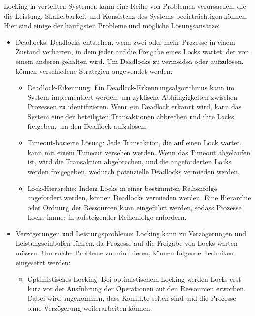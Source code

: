 \documentclass[../vs-script-first-v01.tex]{subfiles}
\begin{document}
Locking in verteilten Systemen kann eine Reihe von Problemen verursachen, die die Leistung, Skalierbarkeit und Konsistenz des Systems beeinträchtigen können. Hier sind einige der häufigsten Probleme und mögliche Lösungsansätze:
\begin{itemize}
\item Deadlocks: Deadlocks entstehen, wenn zwei oder mehr Prozesse in einem Zustand verharren, in dem jeder auf die Freigabe eines Locks wartet, der von einem anderen gehalten wird. Um Deadlocks zu vermeiden oder aufzulösen, können verschiedene Strategien angewendet werden:
\begin{itemize}
\item Deadlock-Erkennung: Ein Deadlock-Erkennungsalgorithmus kann im System implementiert werden, um zyklische Abhängigkeiten zwischen Prozessen zu identifizieren. Wenn ein Deadlock erkannt wird, kann das System eine der beteiligten Transaktionen abbrechen und ihre Locks freigeben, um den Deadlock aufzulösen.

\item Timeout-basierte Lösung: Jede Transaktion, die auf einen Lock wartet, kann mit einem Timeout versehen werden. Wenn das Timeout abgelaufen ist, wird die Transaktion abgebrochen, und die angeforderten Locks werden freigegeben, wodurch potenzielle Deadlocks vermieden werden.

\item Lock-Hierarchie: Indem Locks in einer bestimmten Reihenfolge angefordert werden, können Deadlocks vermieden werden. Eine Hierarchie oder Ordnung der Ressourcen kann eingeführt werden, sodass Prozesse Locks immer in aufsteigender Reihenfolge anfordern.
\end{itemize}
\item Verzögerungen und Leistungsprobleme: Locking kann zu Verzögerungen und Leistungseinbußen führen, da Prozesse auf die Freigabe von Locks warten müssen. Um solche Probleme zu minimieren, können folgende Techniken eingesetzt werden:
\begin{itemize}
\item Optimistisches Locking: Bei optimistischem Locking werden Locks erst kurz vor der Ausführung der Operationen auf den Ressourcen erworben. Dabei wird angenommen, dass Konflikte selten sind und die Prozesse ohne Verzögerung weiterarbeiten können.


\end{itemize}
\end{itemize}
\end{document}
